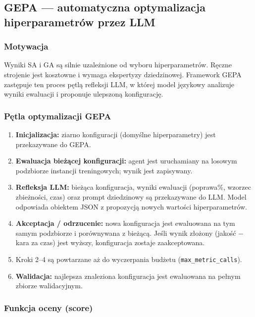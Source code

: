 \documentclass[11pt,a4paper]{article}
\begin{document}
\subsection{GEPA — automatyczna optymalizacja hiperparametrów przez LLM}

\subsubsection*{Motywacja}

Wyniki SA i GA są silnie uzależnione od wyboru hiperparametrów.
Ręczne strojenie jest kosztowne i wymaga ekspertyzy dziedzinowej.
Framework GEPA zastępuje ten proces pętlą refleksji LLM,
w której model językowy analizuje wyniki ewaluacji i proponuje ulepszoną
konfigurację.

\subsubsection*{Pętla optymalizacji GEPA}

\begin{enumerate}
  \item \textbf{Inicjalizacja:} ziarno konfiguracji (domyślne hiperparametry)
        jest przekazywane do GEPA.
  \item \textbf{Ewaluacja bieżącej konfiguracji:} agent jest uruchamiany
        na losowym podzbiorze instancji treningowych; wynik jest zapisywany.
  \item \textbf{Refleksja LLM:} bieżąca konfiguracja, wyniki ewaluacji
        (poprawa\%, wzorzec zbieżności, czas) oraz prompt dziedzinowy
        są przekazywane do LLM.  Model odpowiada obiektem JSON z propozycją
        nowych wartości hiperparametrów.
  \item \textbf{Akceptacja / odrzucenie:} nowa konfiguracja jest ewaluowana
        na tym samym podzbiorze i porównywana z bieżącą.
        Jeśli wynik złożony (jakość $-$ kara za czas) jest wyższy,
        konfiguracja zostaje zaakceptowana.
  \item Kroki 2--4 są powtarzane aż do wyczerpania budżetu
        (\texttt{max\_metric\_calls}).
  \item \textbf{Walidacja:} najlepsza znaleziona konfiguracja jest
        ewaluowana na pełnym zbiorze walidacyjnym.
\end{enumerate}

\subsubsection*{Funkcja oceny (score)}
\end{document}
